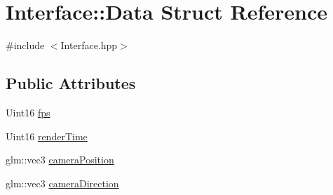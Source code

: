 \hypertarget{structInterface_1_1Data}{\section{Interface\-:\-:Data Struct Reference}
\label{structInterface_1_1Data}
}


{\ttfamily \#include $<$Interface.\-hpp$>$}

\subsection*{Public Attributes}
\begin{DoxyCompactItemize}
\item 
Uint16 \hyperlink{structInterface_1_1Data_a32454196cb04d593a58229fca31cbd9b}{fps}
\item 
Uint16 \hyperlink{structInterface_1_1Data_a13426da957e1f74411b7b01565afe200}{render\-Time}
\item 
glm\-::vec3 \hyperlink{structInterface_1_1Data_a00ec648034e8c2e155bc3985ed0a75cd}{camera\-Position}
\item 
glm\-::vec3 \hyperlink{structInterface_1_1Data_a8ed6f03a832b15c3a938b233ee83a392}{camera\-Direction}
\end{DoxyCompactItemize}


